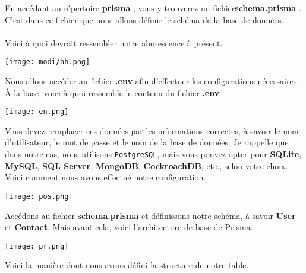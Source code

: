 \documentclass{article}
\begin{document}
En accédant au répertoire \textbf{prisma} , vous y trouverez un fichier\textbf{schema.prisma} . C’est dans ce fichier que nous allons définir le schéma de la base de données. \\\\
Voici à quoi devrait ressembler notre aborescence à présent.
\vspace{1cm}

\begin{center} \texttt{[image: modi/hh.png]} \end{center}
Nous allons accéder au fichier \textbf{.env} afin d’effectuer les configurations nécessaires.
À la base, voici à quoi ressemble le contenu du fichier \textbf{.env}
\begin{center} \texttt{[image: en.png]} \end{center}

Vous devez remplacer ces données par les informations correctes, à savoir le nom d'utilisateur, le mot de passe et le nom de la base de données. Je rappelle que dans notre cas, nous utilisons \texttt{PostgreSQL}, mais vous pouvez opter pour \textbf{SQLite}, \textbf{MySQL}, \textbf{SQL Server}, \textbf{MongoDB}, \textbf{CockroachDB}, etc., selon votre choix. Voici comment nous avons effectué notre configuration.

\begin{center} \texttt{[image: pos.png]} \end{center}
Accédons au fichier \textbf{schema.prisma} et définissons notre schéma, à savoir \textbf{User} et \textbf{Contact}. Mais avant cela, voici l'architecture de base de Prisma.

\begin{center} 
    \texttt{[image: pr.png]} 
\end{center}

Voici la manière dont nous avons défini la structure de notre table.
\end{document}
